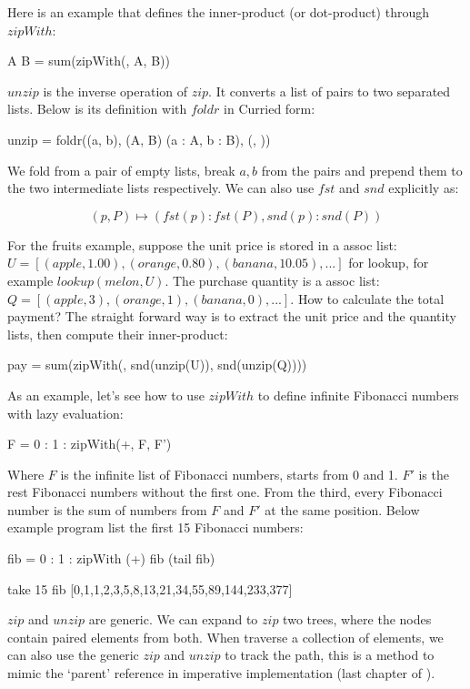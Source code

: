 \documentclass[b5paper]{article}
\begin{document}
Here is an example that defines the inner-product (or dot-product)\cite{wiki-dot-product} through $zipWith$:

\be
A \cdot B = sum(zipWith(\cdot, A, B))
\ee

$unzip$ is the inverse operation of $zip$. It converts a list of pairs to two separated lists. Below is its definition with $foldr$ in Curried form:

\be
unzip = foldr((a, b), (A, B) \mapsto (a : A, b : B), (\nil, \nil))
\ee

We fold from a pair of empty lists, break $a, b$ from the pairs and prepend them to the two intermediate lists respectively. We can also use $fst$ and $snd$ explicitly as:

\[
(p, P) \mapsto (fst(p) : fst(P), snd(p) : snd(P))
\]

For the fruits example, suppose the unit price is stored in a assoc list: $U = [(apple, 1.00), (orange, 0.80), (banana, 10.05), ...]$ for lookup, for example $lookup(melon, U)$. The purchase quantity is a assoc list: $Q = [(apple, 3), (orange, 1), (banana, 0), ...]$. How to calculate the total payment? The straight forward way is to extract the unit price and the quantity lists, then compute their inner-product:

\be
pay = sum(zipWith(\cdot, snd(unzip(U)), snd(unzip(Q))))
\ee

As an example, let's see how to use $zipWith$ to define infinite Fibonacci numbers with lazy evaluation:

\be
F = 0 : 1 : zipWith(+, F, F')
\ee

Where $F$ is the infinite list of Fibonacci numbers, starts from 0 and 1. $F'$ is the rest Fibonacci numbers without the first one. From the third, every Fibonacci number is the sum of numbers from $F$ and $F'$ at the same position. Below example program list the first 15 Fibonacci numbers:

\begin{Haskell}
fib = 0 : 1 : zipWith (+) fib (tail fib)

take 15 fib
[0,1,1,2,3,5,8,13,21,34,55,89,144,233,377]
\end{Haskell}

$zip$ and $unzip$ are generic. We can expand to $zip$ two trees, where the nodes contain paired elements from both. When traverse a collection of elements, we can also use the generic $zip$ and $unzip$ to track the path, this is a method to mimic the `parent' reference in imperative implementation (last chapter of \cite{learn-haskell}).
\end{document}
